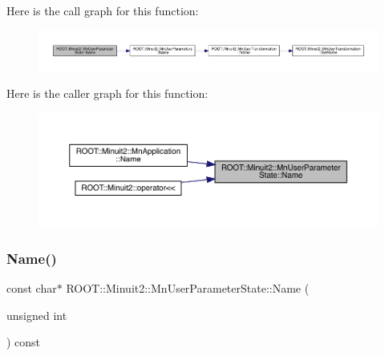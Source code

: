 Here is the call graph for this function\+:\nopagebreak
\begin{figure}[H]
\begin{center}
\leavevmode
\includegraphics[width=350pt]{d3/de0/classROOT_1_1Minuit2_1_1MnUserParameterState_a9bb4ce8eb968c5112c3e33a0b7a32609_cgraph}
\end{center}
\end{figure}
Here is the caller graph for this function\+:\nopagebreak
\begin{figure}[H]
\begin{center}
\leavevmode
\includegraphics[width=350pt]{d3/de0/classROOT_1_1Minuit2_1_1MnUserParameterState_a9bb4ce8eb968c5112c3e33a0b7a32609_icgraph}
\end{center}
\end{figure}
\mbox{\label{classROOT_1_1Minuit2_1_1MnUserParameterState_afe93ae6453653734e45f0d66d64a609c}} 
\subsubsection{\texorpdfstring{Name()}{Name()}\hspace{0.1cm}{\footnotesize\ttfamily [2/2]}}
{\footnotesize\ttfamily const char$\ast$ R\+O\+O\+T\+::\+Minuit2\+::\+Mn\+User\+Parameter\+State\+::\+Name (\begin{DoxyParamCaption}\item[{unsigned int}]{ }\end{DoxyParamCaption}) const}

\mbox{\label{classROOT_1_1Minuit2_1_1MnUserParameterState_a21fb0f06261f9bed8359263a99f7d5ca}} 
